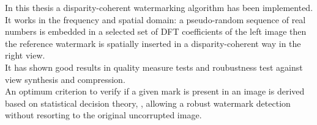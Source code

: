 


In this thesis a disparity-coherent watermarking algorithm has been implemented. It works in the frequency and spatial domain: a pseudo-random sequence of real numbers is embedded in a selected set of DFT coefficients of the left image then  the reference watermark is spatially inserted in a disparity-coherent way in the right view.\\
It has shown good results in quality measure tests and roubustness test against view synthesis and compression.\\
An optimum criterion to verify if a given mark is present in an image is derived based on statistical decision theory, \cite{STAT}, allowing a robust watermark detection without resorting to the original uncorrupted image.\\







